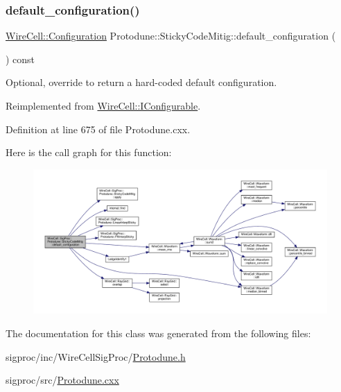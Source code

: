 \subsubsection{\texorpdfstring{default\+\_\+configuration()}{default\_configuration()}}
{\footnotesize\ttfamily \hyperlink{namespace_wire_cell_a9f705541fc1d46c608b3d32c182333ee}{Wire\+Cell\+::\+Configuration} Protodune\+::\+Sticky\+Code\+Mitig\+::default\+\_\+configuration (\begin{DoxyParamCaption}{ }\end{DoxyParamCaption}) const\hspace{0.3cm}{\ttfamily [virtual]}}



Optional, override to return a hard-\/coded default configuration. 



Reimplemented from \hyperlink{class_wire_cell_1_1_i_configurable_a54841b2da3d1ea02189478bff96f7998}{Wire\+Cell\+::\+I\+Configurable}.



Definition at line 675 of file Protodune.\+cxx.

Here is the call graph for this function\+:
\nopagebreak
\begin{figure}[H]
\begin{center}
\leavevmode
\includegraphics[width=350pt]{class_wire_cell_1_1_sig_proc_1_1_protodune_1_1_sticky_code_mitig_aa42dce81ba4e7dad67cc5653c9a8249f_cgraph}
\end{center}
\end{figure}


The documentation for this class was generated from the following files\+:\begin{DoxyCompactItemize}
\item 
sigproc/inc/\+Wire\+Cell\+Sig\+Proc/\hyperlink{_protodune_8h}{Protodune.\+h}\item 
sigproc/src/\hyperlink{_protodune_8cxx}{Protodune.\+cxx}\end{DoxyCompactItemize}
